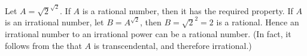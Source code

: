 \documentclass[12pt]{article}
\begin{document}
Let $A=\sqrt{2}^{\sqrt{2}}$.
If $A$ is a rational number, then it has the required property.
If $A$ is an irrational number, let $B = A^{\sqrt{2}}$,
then $B=\sqrt{2}^2 = 2$ is a rational.
Hence an irrational number to an irrational power can be a rational number.
(In fact, it follows from the  that $A$ is transcendental, and therefore irrational.)
\end{document}
